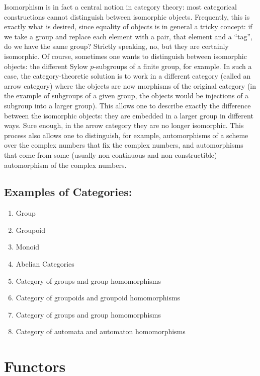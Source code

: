 \documentclass[12pt]{article}
\begin{document}
Isomorphism is in fact a central notion in category theory: most categorical constructions cannot distinguish between isomorphic objects.  Frequently, this is exactly what is desired, since equality of objects is in general a tricky concept: if we take a group and replace each element with a pair, that element and a ``tag'', do we have the same group?  Strictly speaking, no, but they are certainly isomorphic.  Of course, sometimes one wants to distinguish between isomorphic objects: the different Sylow $p$-subgroups of a finite group, for example.  In such a case, the category-theoretic solution is to work in a different category (called an arrow category) where the objects are now morphisms of the original category (in the example of subgroups of a given group, the objects would be injections of a subgroup into a larger group).  This allows one to describe exactly the difference between the isomorphic objects: they are embedded in a larger group in different ways.  Sure enough, in the arrow category they are no longer isomorphic.  This process also allows one to distinguish, for example, automorphisms of a scheme over the complex numbers that fix the complex numbers, and automorphisms that come from some (usually non-continuous and non-constructible) automorphism of the complex numbers. 

\subsection{Examples of Categories:}
\begin{enumerate}
\item Group 
\item Groupoid
\item Monoid
\item Abelian Categories
\item Category of groups and group homomorphisms
\item Category of groupoids and groupoid homomorphisms
\item Category of groups and group homomorphisms
\item Category of automata and automaton homomorphisms
\end{enumerate}

\section*{Functors}
\end{document}
